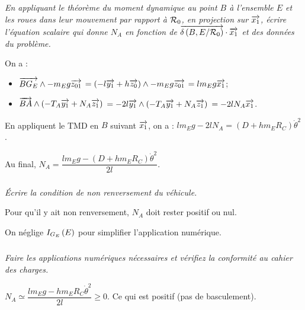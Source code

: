 \documentclass[10pt,fleqn]{article} %
\begin{document}
\begin{multicols}{2}
\begin{corrige}
\end{corrige}
\else
\fi

\subparagraph{}\textit{En appliquant le théorème du moment dynamique au point $B$ à l'ensemble $E$ et les roues dans leur mouvement par rapport à $\mathcal{R}_{0}$, en projection sur $\overrightarrow{x_1}$, écrire l’équation scalaire qui donne $N_A$ en fonction de $\overrightarrow{\delta \left( {B}, {E} /{\mathcal{R}_{0}}\right)}\cdot \overrightarrow{x_1}$ et des données du problème.}
\ifprof
\begin{corrige}
On a : 
\begin{itemize}
\item $\overrightarrow{BG_E}\wedge - m_E g \overrightarrow{z_{01}}$ 
$=\left(-l\overrightarrow{y_1}+h\overrightarrow{z_0} \right) \wedge - m_E g \overrightarrow{z_{01}}$
$=l  m_E g \overrightarrow{x_{1}}$;
\item $\overrightarrow{BA}\wedge \left(-T_A\overrightarrow{y_1}+N_A\overrightarrow{z_1} \right)$ 
$=-2l\overrightarrow{y_1}\wedge \left(-T_A\overrightarrow{y_1}+N_A\overrightarrow{z_1} \right)$
$=-2l N_A\overrightarrow{x_1} $.
\end{itemize}
En appliquent le TMD en $B$ suivant $\overrightarrow{x_1}$, on a : $l  m_E g -2l N_A=\left(D+ h m_E R_C\right)\dot{\theta}^2$. 

Au final,  $ N_A=\dfrac{ l  m_E g-\left(D+ h m_E R_C\right)\dot{\theta}^2}{2l}$. 
\end{corrige}
\else
\fi

\subparagraph{}\textit{Écrire la condition de non renversement du véhicule.}
\ifprof
\begin{corrige}
Pour qu'il y ait non renversement, $N_A$ doit rester positif ou nul. 
\end{corrige}
\else
\fi

On néglige $I_{G_E}\left( E\right)$ pour simplifier l’application numérique.

\subparagraph{}\textit{Faire les applications numériques nécessaires et vérifiez la conformité au cahier des charges.}
\ifprof
\begin{corrige}
$ N_A\simeq\dfrac{l  m_E g-h m_E R_C\dot{\theta}^2 }{2l} \geq 0$.%
Ce qui est positif (pas de basculement). 
\end{corrige}
\else
\fi





\end{multicols}
\end{document}
